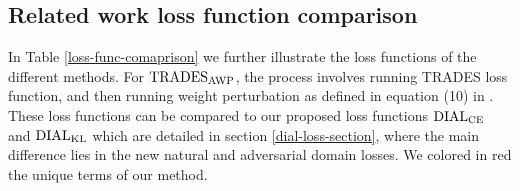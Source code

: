 






















\subsection{Related work loss function comparison}
\label{related-loss-func}
In Table \ref{loss-func-comaprison} we further illustrate the loss functions of the different methods. 
For $\operatorname{TRADES}_{\operatorname{AWP}}$, the process involves running TRADES loss function, and then running weight perturbation as defined in equation (10) in \citep{wu2020adversarial}.
These loss functions can be compared to our proposed loss functions $\operatorname{DIAL}_{\operatorname{CE}}$ and $\operatorname{DIAL}_{\operatorname{KL}}$ which are detailed in section \ref{dial-loss-section}, where the main difference lies in the new natural and adversarial domain losses. We colored in red the unique terms of our method.

